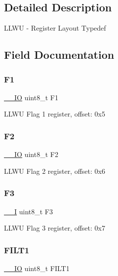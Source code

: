 \subsection{Detailed Description}
L\+L\+WU -\/ Register Layout Typedef 

\subsection{Field Documentation}
\mbox{\label{struct_l_l_w_u___type_a07810538c8d6aba73ee3dd0c573256c7}} 
\subsubsection{\texorpdfstring{F1}{F1}}
{\footnotesize\ttfamily \mbox{\hyperlink{core__cm0plus_8h_aec43007d9998a0a0e01faede4133d6be}{\+\_\+\+\_\+\+IO}} uint8\+\_\+t F1}

L\+L\+WU Flag 1 register, offset\+: 0x5 \mbox{\label{struct_l_l_w_u___type_a8390d51184687794c312ac5148cc9e2b}} 
\subsubsection{\texorpdfstring{F2}{F2}}
{\footnotesize\ttfamily \mbox{\hyperlink{core__cm0plus_8h_aec43007d9998a0a0e01faede4133d6be}{\+\_\+\+\_\+\+IO}} uint8\+\_\+t F2}

L\+L\+WU Flag 2 register, offset\+: 0x6 \mbox{\label{struct_l_l_w_u___type_a9830952a98862ed103ad0cff61b77bb5}} 
\subsubsection{\texorpdfstring{F3}{F3}}
{\footnotesize\ttfamily \mbox{\hyperlink{core__cm0plus_8h_af63697ed9952cc71e1225efe205f6cd3}{\+\_\+\+\_\+I}} uint8\+\_\+t F3}

L\+L\+WU Flag 3 register, offset\+: 0x7 \mbox{\label{struct_l_l_w_u___type_afbd6f1eb8283eca63c4ea3c3d657f149}} 
\subsubsection{\texorpdfstring{FILT1}{FILT1}}
{\footnotesize\ttfamily \mbox{\hyperlink{core__cm0plus_8h_aec43007d9998a0a0e01faede4133d6be}{\+\_\+\+\_\+\+IO}} uint8\+\_\+t F\+I\+L\+T1}


